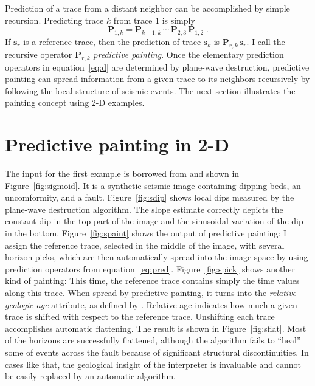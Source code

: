 Prediction of a trace from a distant neighbor can be accomplished by
simple recursion. Predicting trace $k$ from trace $1$ is simply
\begin{equation}
  \label{eq:pred}
  \mathbf{P}_{1,k} = \mathbf{P}_{k-1,k}\,
  \cdots\,\mathbf{P}_{2,3}\,\mathbf{P}_{1,2}\;.
\end{equation}
If $\mathbf{s}_r$ is a reference trace, then the prediction of
  trace $\mathbf{s}_k$ is $\mathbf{P}_{r,k}\,\mathbf{s}_r$. I call
the recursive operator $\mathbf{P}_{r,k}$
\emph{predictive painting}. Once the elementary prediction operators
in equation~\ref{eq:d} are determined by plane-wave destruction,
predictive painting can spread information from a given trace to its
neighbors recursively by following the local structure of seismic
events. The next section illustrates the painting concept using 2-D
examples.

\section{Predictive painting in 2-D}


The input for the first example is borrowed from \cite{bei} and shown
in Figure~\ref{fig:sigmoid}. It is a synthetic seismic image
containing dipping beds, an uncomformity, and a
fault. Figure~\ref{fig:sdip} shows local dips measured by the
plane-wave destruction algorithm. The slope estimate correctly depicts
the constant dip in the top part of the image and the sinusoidal
variation of the dip in the bottom.  Figure~\ref{fig:spaint} shows the
output of predictive painting: I assign the reference trace, selected
in the middle of the image, with several horizon picks, which are then
automatically spread into the image space by using prediction
operators from equation~\ref{eq:pred}. Figure~\ref{fig:spick} shows
another kind of painting: This time, the reference trace contains
simply the time values along this trace. When spread by
predictive painting, it turns into the \emph{relative geologic age}
attribute, as defined by \cite{stark}.  Relative age indicates how
much a given trace is shifted with respect to the reference
trace. Unshifting each trace accomplishes automatic flattening. The
result is shown in Figure~\ref{fig:sflat}. Most of the horizons are
successfully flattened, although the algorithm fails to ``heal'' some
of events across the fault because of significant structural
discontinuities. In cases like that, the geological
insight of the interpreter is invaluable and cannot be easily replaced
by an automatic algorithm.

